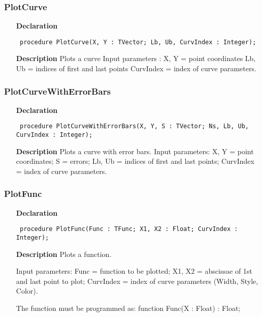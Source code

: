 \documentclass[12pt,a4paper,oneside]{report}
\newcommand{\declarationitem}[1]{\textbf{#1}}
\newcommand{\descriptiontitle}[1]{\textbf{#1}}
\newcommand{\code}[1]{\texttt{#1}}
\begin{document}
\subsubsection{PlotCurve}
\label{uplot-PlotCurve}
\begin{itemize}\item[\declarationitem{Declaration}\hfill]
	\begin{flushleft}
		\code{
			procedure PlotCurve(X, Y : TVector; Lb, Ub, CurvIndex : Integer);}
		
	\end{flushleft}
	
	\par
	\item[\descriptiontitle{Description}]
	Plots a curve Input parameters : X, Y = point coordinates Lb, Ub = indices of first and last points CurvIndex = index of curve parameters.
	
\end{itemize}
\subsubsection{PlotCurveWithErrorBars}
\label{uplot-PlotCurveWithErrorBars}
\begin{itemize}\item[\declarationitem{Declaration}\hfill]
	\begin{flushleft}
		\code{
			procedure PlotCurveWithErrorBars(X, Y, S : TVector; Ns, Lb, Ub, CurvIndex : Integer);}
		
	\end{flushleft}
	
	\par
	\item[\descriptiontitle{Description}]
	Plots a curve with error bars. Input parameters: X, Y = point coordinates; S = errors; Lb, Ub = indices of first and last points; CurvIndex = index of curve parameters.
	
\end{itemize}
\subsubsection{PlotFunc}
\label{uplot-PlotFunc}
\begin{itemize}\item[\declarationitem{Declaration}\hfill]
	\begin{flushleft}
		\code{
			procedure PlotFunc(Func : TFunc; X1, X2 : Float; CurvIndex : Integer);}
		
	\end{flushleft}
	
	\par
	\item[\descriptiontitle{Description}]
	Plots a function.
	
	Input parameters: Func = function to be plotted; X1, X2 = abscissae of 1st and last point to plot; CurvIndex = index of curve parameters (Width, Style, Color).
	
	The function must be programmed as: function Func(X : Float) : Float;
	
\end{itemize}
\end{document}
